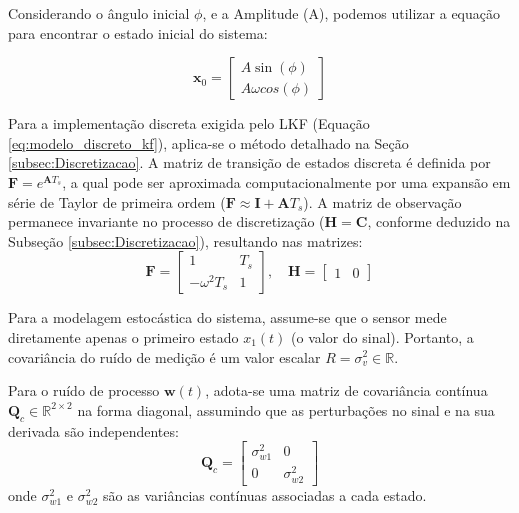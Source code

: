 \documentclass[a4paper,12pt]{article}
\begin{document}
Considerando o ângulo inicial $\phi$, e a Amplitude (A), podemos utilizar a equação para encontrar o estado inicial do sistema:

\begin{equation}
    \mathbf{x}_0 = \begin{bmatrix}
        A\sin(\phi) \\
        A \omega cos(\phi)
    \end{bmatrix}
\end{equation}

Para a implementação discreta exigida pelo LKF (Equação \eqref{eq:modelo_discreto_kf}), aplica-se o método detalhado na Seção \ref{subsec:Discretizacao}. A matriz de transição de estados discreta é definida por $\mathbf{F} = e^{\mathbf{A}T_s}$, a qual pode ser aproximada computacionalmente por uma expansão em série de Taylor de primeira ordem ($\mathbf{F} \approx \mathbf{I} + \mathbf{A}T_s$). A matriz de observação permanece invariante no processo de discretização ($\mathbf{H} = \mathbf{C}$, conforme deduzido na Subseção \ref{subsec:Discretizacao}), resultando nas matrizes:
\begin{equation}
    \mathbf{F} = \begin{bmatrix} 1 & T_s \\ -\omega^2 T_s & 1 \end{bmatrix}, \quad \mathbf{H} = \begin{bmatrix} 1 & 0 \end{bmatrix}
    \label{eq:mod1_matrizes_finais}
\end{equation}

Para a modelagem estocástica do sistema, assume-se que o sensor mede diretamente apenas o primeiro estado $x_1(t)$ (o valor do sinal). Portanto, a covariância do ruído de medição é um valor escalar $R = \sigma_v^2 \in \mathbb{R}$. 

Para o ruído de processo $\mathbf{w}(t)$, adota-se uma matriz de covariância contínua $\mathbf{Q}_c \in \mathbb{R}^{2 \times 2}$ na forma diagonal, assumindo que as perturbações no sinal e na sua derivada são independentes:
\begin{equation}
    \mathbf{Q}_c = \begin{bmatrix} \sigma_{w1}^2 & 0 \\ 0 & \sigma_{w2}^2 \end{bmatrix}
\end{equation}
onde $\sigma_{w1}^2$ e $\sigma_{w2}^2$ são as variâncias contínuas associadas a cada estado.
\end{document}
